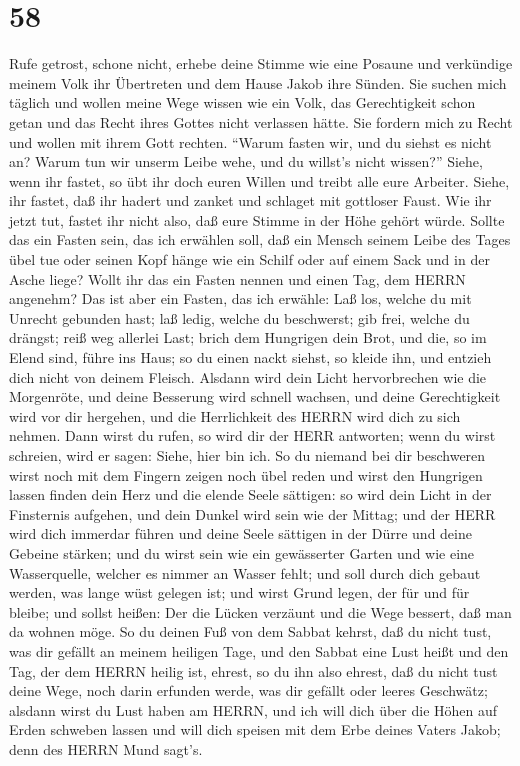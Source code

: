 \hypertarget{section-57}{%
\section{58}\label{section-57}}

 Rufe getrost, schone nicht, erhebe deine Stimme wie eine
Posaune und verkündige meinem Volk ihr Übertreten und dem Hause Jakob
ihre Sünden.  Sie suchen mich täglich und wollen meine Wege
wissen wie ein Volk, das Gerechtigkeit schon getan und das Recht ihres
Gottes nicht verlassen hätte. Sie fordern mich zu Recht und wollen mit
ihrem Gott rechten.  ``Warum fasten wir, und du siehst es
nicht an? Warum tun wir unserm Leibe wehe, und du willst's nicht
wissen?'' Siehe, wenn ihr fastet, so übt ihr doch euren Willen und
treibt alle eure Arbeiter.  Siehe, ihr fastet, daß ihr
hadert und zanket und schlaget mit gottloser Faust. Wie ihr jetzt tut,
fastet ihr nicht also, daß eure Stimme in der Höhe gehört würde.
 Sollte das ein Fasten sein, das ich erwählen soll, daß ein
Mensch seinem Leibe des Tages übel tue oder seinen Kopf hänge wie ein
Schilf oder auf einem Sack und in der Asche liege? Wollt ihr das ein
Fasten nennen und einen Tag, dem HERRN angenehm?  Das ist
aber ein Fasten, das ich erwähle: Laß los, welche du mit Unrecht
gebunden hast; laß ledig, welche du beschwerst; gib frei, welche du
drängst; reiß weg allerlei Last;  brich dem Hungrigen dein
Brot, und die, so im Elend sind, führe ins Haus; so du einen nackt
siehst, so kleide ihn, und entzieh dich nicht von deinem Fleisch.
 Alsdann wird dein Licht hervorbrechen wie die Morgenröte,
und deine Besserung wird schnell wachsen, und deine Gerechtigkeit wird
vor dir hergehen, und die Herrlichkeit des HERRN wird dich zu sich
nehmen.  Dann wirst du rufen, so wird dir der HERR
antworten; wenn du wirst schreien, wird er sagen: Siehe, hier bin ich.
So du niemand bei dir beschweren wirst noch mit dem Fingern zeigen noch
übel reden  und wirst den Hungrigen lassen finden dein Herz
und die elende Seele sättigen: so wird dein Licht in der Finsternis
aufgehen, und dein Dunkel wird sein wie der Mittag;  und
der HERR wird dich immerdar führen und deine Seele sättigen in der Dürre
und deine Gebeine stärken; und du wirst sein wie ein gewässerter Garten
und wie eine Wasserquelle, welcher es nimmer an Wasser fehlt;
 und soll durch dich gebaut werden, was lange wüst gelegen
ist; und wirst Grund legen, der für und für bleibe; und sollst heißen:
Der die Lücken verzäunt und die Wege bessert, daß man da wohnen möge.
 So du deinen Fuß von dem Sabbat kehrst, daß du nicht tust,
was dir gefällt an meinem heiligen Tage, und den Sabbat eine Lust heißt
und den Tag, der dem HERRN heilig ist, ehrest, so du ihn also ehrest,
daß du nicht tust deine Wege, noch darin erfunden werde, was dir gefällt
oder leeres Geschwätz;  alsdann wirst du Lust haben am
HERRN, und ich will dich über die Höhen auf Erden schweben lassen und
will dich speisen mit dem Erbe deines Vaters Jakob; denn des HERRN Mund
sagt's.

